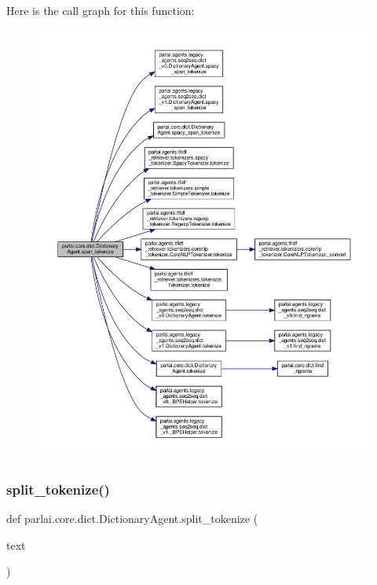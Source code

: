 Here is the call graph for this function\+:
\nopagebreak
\begin{figure}[H]
\begin{center}
\leavevmode
\includegraphics[width=350pt]{classparlai_1_1core_1_1dict_1_1DictionaryAgent_a8fede3cf83af6a47c5dd4bb356de3350_cgraph}
\end{center}
\end{figure}
\mbox{\label{classparlai_1_1core_1_1dict_1_1DictionaryAgent_a826ba5c6ff36c8ddf5d7723c50e5616d}} 
\subsubsection{\texorpdfstring{split\+\_\+tokenize()}{split\_tokenize()}}
{\footnotesize\ttfamily def parlai.\+core.\+dict.\+Dictionary\+Agent.\+split\+\_\+tokenize (\begin{DoxyParamCaption}\item[{}]{text }\end{DoxyParamCaption})\hspace{0.3cm}{\ttfamily [static]}}

